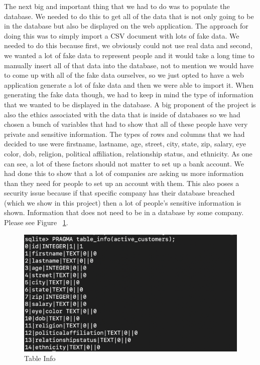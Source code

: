 The next big and important thing that we had to do was to populate the database. We needed
to do this to get all of the data that is not only going to be in
the database but also be displayed on the web application. The approach for doing this was to
simply import a CSV document with lots of fake data. We needed to do this because first,
we obviously could not use real data and second, we wanted a lot of fake data to represent
people and it would take a long time to manually insert all of that data into the
database, not to mention we would have to come up with all of the fake data ourselves, so
we just opted to have a web application generate a lot of fake data and then we were able to import
it. When generating the fake data though, we had to keep in mind the type of
information that we wanted to be displayed in the database. A big proponent of the
project is also the ethics associated with the data that is inside of databases so
we had chosen a bunch of variables that had to show that all of these people have very
private and sensitive information. The types of rows and columns that we had decided to
use were firstname, lastname, age, street, city, state, zip, salary, eye color, dob, religion,
political affiliation, relationship status, and ethnicity. As one can see, a lot of
these factors should not matter to set up a bank account. We had done this to show
that a lot of companies are asking us more information than they need for people
to set up an account with them. This also poses a security issue because if that specific
company has their database breached (which we show in this project) then a lot of people's
sensitive information is shown. Information that does not need to be in a database by some
company. Please see Figure ~\ref{fig:table info}.

\bigskip
\bigskip
\begin{figure}[hbt!]
\centering
\includegraphics[width=5in]{../images/column-names.png}%
\caption{Table Info}
\label{fig:table info}
\end{figure}
\bigskip
\bigskip

